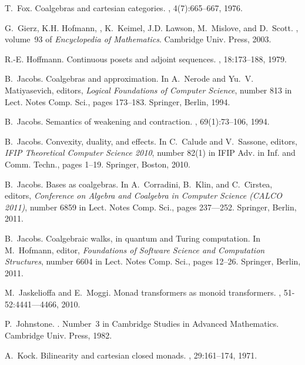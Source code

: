 \documentclass{LMCS}
\begin{document}
\begin{thebibliography}{10}
T.~Fox.
\newblock Coalgebras and cartesian categories.
, 4(7):665--667, 1976.

G.~Gierz, K.H. Hofmann, , K.~Keimel, J.D. Lawson, M.~Mislove, and D.~Scott.
, volume~93 of {\em Encyclopedia
  of Mathematics}.
\newblock Cambridge Univ. Press, 2003.

R.-E. Hoffmann.
\newblock Continuous posets and adjoint sequences.
, 18:173--188, 1979.

B.~Jacobs.
\newblock Coalgebras and approximation.
\newblock In A.~Nerode and Yu.~V. Matiyasevich, editors, {\em Logical
  Foundations of Computer Science}, number 813 in Lect. Notes Comp. Sci., pages
  173--183. Springer, Berlin, 1994.

B.~Jacobs.
\newblock Semantics of weakening and contraction.
, 69(1):73--106, 1994.

B.~Jacobs.
\newblock Convexity, duality, and effects.
\newblock In C.~Calude and V.~Sassone, editors, {\em IFIP Theoretical Computer
  Science 2010}, number 82(1) in IFIP Adv. in Inf. and Comm. Techn., pages
  1--19. Springer, Boston, 2010.

B.~Jacobs.
\newblock Bases as coalgebras.
\newblock In A.~Corradini, B.~Klin, and C.~C{\"\i}rstea, editors, {\em
  Conference on Algebra and Coalgebra in Computer Science (CALCO 2011)}, number
  6859 in Lect. Notes Comp. Sci., pages 237–--252. Springer, Berlin, 2011.

B.~Jacobs.
\newblock Coalgebraic walks, in quantum and {Turing} computation.
\newblock In M.~Hofmann, editor, {\em Foundations of Software Science and
  Computation Structures}, number 6604 in Lect. Notes Comp. Sci., pages 12--26.
  Springer, Berlin, 2011.

M.~Jaskelioffa and E.~Moggi.
\newblock Monad transformers as monoid transformers.
, 51-52:4441–--4466, 2010.

P.~Johnstone.
.
\newblock Number~3 in Cambridge Studies in Advanced Mathematics. Cambridge
  Univ. Press, 1982.

A.~Kock.
\newblock Bilinearity and cartesian closed monads.
, 29:161--174, 1971.


\end{thebibliography}
\end{document}
